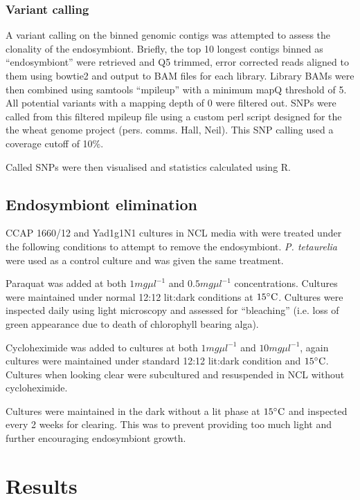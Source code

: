 \subsubsection{Variant calling}

A variant calling on the binned genomic contigs was attempted 
to assess the clonality of the endosymbiont. 
Briefly, the top 10 longest contigs binned as ``endosymbiont'' 
were retrieved and Q5 trimmed, error corrected reads aligned
to them using bowtie2 and output to BAM files for each library.
Library BAMs were then combined using samtools ``mpileup''
with a minimum mapQ threshold of 5.  All potential variants
with a mapping depth of 0 were filtered out.
SNPs were called from this filtered mpileup file
using a custom perl script designed for the 
the wheat genome project (pers. comms. Hall, Neil).
This SNP calling used a coverage cutoff of 10\%.

Called SNPs were then visualised and statistics
calculated using R.

\subsection{Endosymbiont elimination}

CCAP 1660/12 and Yad1g1N1 cultures in NCL media with were treated under the following
conditions to attempt to remove the endosymbiont. 
\textit{P. tetaurelia} were used as a control culture and was
given the same treatment. 

Paraquat was added at both \(1mg\mu l^{-1}\) and
\(0.5mg\mu l^{-1}\) concentrations.
Cultures were maintained under normal 12:12 lit:dark 
conditions at \(15\celsius\).  Cultures were inspected
daily using light microscopy and assessed for ``bleaching'' (i.e. loss of green 
appearance due to death of chlorophyll bearing alga). 

Cycloheximide was added to cultures at both \(1mg\mu l^{-1}\)
and \(10mg\mu l^{-1}\), again cultures were maintained under
standard 12:12 lit:dark condition and \(15\celsius\). 
Cultures when looking clear were subcultured and resuspended in 
NCL without cycloheximide.

Cultures were maintained in the dark without a lit phase
at \(15\celsius\) and inspected every 2 weeks for clearing.
This was to prevent providing too much light and 
further encouraging endosymbiont growth. 


\section{Results}


